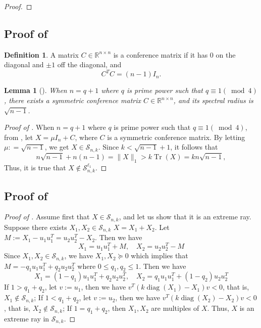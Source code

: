 \documentclass[11pt]{amsart}
\newcommand{\Szero}[2]{\ensuremath{\mathcal{S}_{#1,#2}}}
\newcommand{\Sone}[2]{\ensuremath{\mathcal{S}_{#1,#2}^{\ell_1}}}
\theoremstyle{plain}
\newtheorem{lem}{Lemma}[section]
\theoremstyle{definition}
\newtheorem{dfn}[thm]{Definition}
\theoremstyle{remark}
\newcommand{\RR}{\mathbb{R}}
\renewcommand{\SS}{{\mathbb{S}}}
\newcommand{\st}{\text{\, s.t.\, }}
\DeclareMathOperator{\conv}{conv}
\DeclareMathOperator{\diag}{diag}
\DeclareMathOperator{\tr}{Tr}
\begin{document}
\begin{appendices}
\begin{proof}
		\end{proof}
		
		\subsection{Proof of }\label{append:thm_Szero_notsubset_Sone}
		\begin{dfn}
			A matrix $C\in \RR^{n\times n}$ is a conference matrix if it has 0 on the diagonal and \(\pm 1\) off the diagonal, and 
			\[
			C^TC = (n-1)I_n.
			\]
		\end{dfn}
		\begin{lem}[\cite{haemers2022spectral}]\label{lem:conference_matrix}
			When \(n=q+1\) where \(q\) is prime power such that \(q\equiv1(\bmod 4)\), there exists a symmetric conference matrix \(C \in \RR^{n\times n}\), and its spectral radius is \(\sqrt{n-1}\).
		\end{lem}
		
		\begin{proof}[Proof of ]
			When \(n=q+1\) where \(q\) is prime power such that \(q\equiv1(\bmod 4)\), from , let \(X = \mu I_n + C\), where $C$ is a symmetric conference matrix.  By letting $\mu: = \sqrt{n-1}$, we get \(X \in \Szero{n}{k}\).  Since \(k < \sqrt{n-1}+1\), it follows that
        \[
        n\sqrt{n-1} + n(n-1) = \|X\|_1 > k \tr(X) = kn\sqrt{n-1},
        \]
       Thus, it is true that \(X \notin \Sone{n}{k}\). 
		\end{proof}

        \subsection{Proof of  }\label{append:thm_extreme_ray_special}
		
	
	\begin{proof}[Proof of ]
        Assume first that \(X\in\Szero{n}{k}\), and let us show that it is an extreme ray.
        Suppose there exists \(X_1,X_2\in \Szero{n}{k}\) \st \(X = X_1 + X_2\). Let \(M := X_1 - u_1u_1^T =  u_2u_2^T - X_2\). Then we have
		\[
		X_1 = u_1u_1^T + M,\quad X_2 = u_2u_2^T - M
		\]
		Since \(X_1,X_2\in \Szero{n}{k}\), we have \(X_1,X_2\succeq 0\) which implies that \(M =-q_1 u_1u_1^T + q_2u_2u_2^T\) where \(0\leq q_1,q_2\leq 1\). Then we have
		\[
		X_1 = (1-q_1) u_1u_1^T + q_2u_2u_2^T,\quad X_2 = q_1u_1u_1^T + (1-q_2) u_2u_2^T 
		\]
		If \(1>q_1 + q_2\), let \(v:= u_1\), then we have \(v^T(k\diag(X_1)-X_1)v<0\), that is, \(X_1\notin \Szero{n}{k}\); If \(1<q_1 + q_2\), let \(v:= u_2\), then we have \(v^T(k\diag(X_2)-X_2)v<0\), that is, \(X_2\notin \Szero{n}{k}\); 
		If \(1 = q_1 + q_2\), then \(X_1,X_2\) are multiples of \(X\).   Thus, \(X\) is an extreme ray in \Szero{n}{k}. 
		

\end{proof}
\end{appendices}
\end{document}
